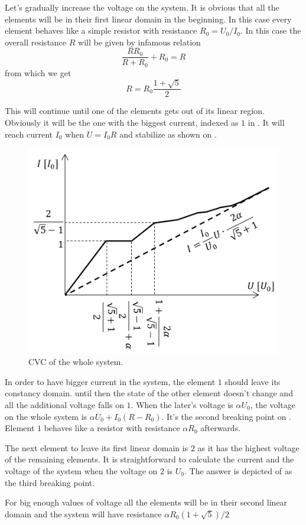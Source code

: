 Let's gradually increase the voltage on the system.
It is obvious that
all the elements will be in their first linear domain in the beginning.
In this case every element behaves like a simple resistor
with resistance $R_0 = U_0 / I_0$.
In this case the overall resistance $R$ will be given by infamous relation
\begin{equation}
    \frac{R R_0}{R + R_0} + R_0 = R
\end{equation}
from which we get
\begin{equation}
    R = R_0 \frac{1+\sqrt{5}}{2}
\end{equation}

This will continue until one of the elements
gets out of its linear region.
Obviously it will be the one with the biggest current,
indexed as $1$ in .
It will reach current $I_0$ when $U = I_0 R$ and stabilize
as shown on .

\begin{figure}
    \centering
    \vspace{-.5cm}
    \includegraphics[width = .5\textwidth]{S-2}
    \caption{CVC of the whole system.}
    \vspace{-.5cm}
\end{figure}

In order to have bigger current in the system,
the element $1$ should leave its constancy domain.
until then the state of the other element doesn't change
and all the additional voltage falls on $1$.
When the later's voltage is $\alpha U_0$,
the voltage on the whole system is $\alpha U_0 + I_0 (R - R_0)$.
It's the second breaking point on .
Element $1$ behaves like a resistor with resistance $\alpha R_0$ afterwards.

The next element to leave its first linear domain is $2$ 
as it has the highest voltage of the remaining elements.
It is straightforward to calculate the current and the voltage of the system
when the voltage on $2$ is $U_0$.
The answer is depicted of  as the third breaking point.

For big enough values of voltage
all the elements will be in their second linear domain
and the system will have resistance $\alpha R_0 (1+\sqrt{5})/2$
